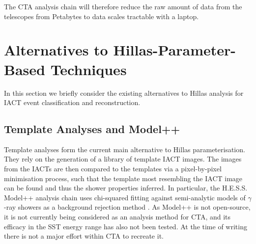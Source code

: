 The CTA analysis chain will therefore reduce the raw amount of data from the telescopes from Petabytes to data scales tractable with a laptop.

\section{Alternatives to Hillas-Parameter-Based Techniques}
In this section we briefly consider the existing alternatives to Hillas analysis for IACT event classification and reconstruction.
\subsection{Template Analyses and Model++}
Template analyses \cite{model++} \cite{cat} \cite{3danalysis}  \cite{impact} form the current main alternative to Hillas parameterisation. They rely on the generation of a library of template IACT images. The images from the IACTs are then compared to the templates via a pixel-by-pixel minimisation process, such that the template most resembling the IACT image can be found and thus the shower properties inferred. In particular, the H.E.S.S. Model++ analysis chain uses chi-squared fitting against semi-analytic models of $\gamma$-ray showers as a background rejection method \cite{model++}. As Model++ is not open-source, it is not currently being considered as an analysis method for CTA, and its efficacy in the SST energy range has also not been tested. At the time of writing there is not a major effort within CTA to recreate it.

